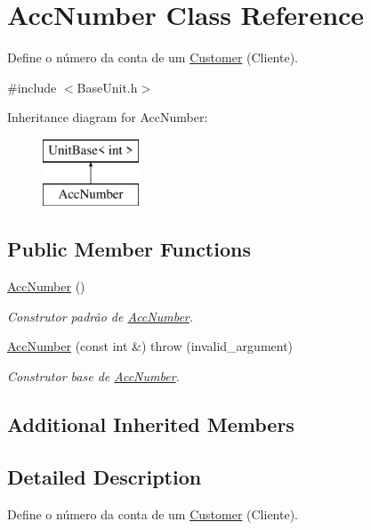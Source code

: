 \hypertarget{classAccNumber}{\section{Acc\-Number Class Reference}
\label{df/d00/classAccNumber}
}


Define o número da conta de um \hyperlink{classCustomer}{Customer} (Cliente).  




{\ttfamily \#include $<$Base\-Unit.\-h$>$}

Inheritance diagram for Acc\-Number\-:\begin{figure}[H]
\begin{center}
\leavevmode
\includegraphics[height=2.000000cm]{df/d00/classAccNumber}
\end{center}
\end{figure}
\subsection*{Public Member Functions}
\begin{DoxyCompactItemize}
\item 
\hyperlink{classAccNumber_a575010043b498581f92c6c4cd62a80ac}{Acc\-Number} ()
\begin{DoxyCompactList}\small\item\em Construtor padrão de \hyperlink{classAccNumber}{Acc\-Number}. \end{DoxyCompactList}\item 
\hyperlink{classAccNumber_adf37dc081ad18a2a6968d9d0b9f92002}{Acc\-Number} (const int \&)  throw (invalid\-\_\-argument)
\begin{DoxyCompactList}\small\item\em Construtor base de \hyperlink{classAccNumber}{Acc\-Number}. \end{DoxyCompactList}\end{DoxyCompactItemize}
\subsection*{Additional Inherited Members}


\subsection{Detailed Description}
Define o número da conta de um \hyperlink{classCustomer}{Customer} (Cliente). 


